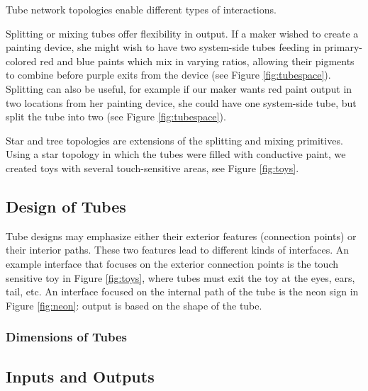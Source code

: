 Tube network topologies enable different types of interactions.

Splitting or mixing tubes offer flexibility in output.  If a maker wished to create a painting device, she might wish to have two system-side tubes feeding in primary-colored red and blue paints which mix in varying ratios, allowing their pigments to combine before purple exits from the device (see Figure \ref{fig:tubespace}).  Splitting can also be useful, for example if our maker wants red paint output in two locations from her painting device, she could have one system-side tube, but split the tube into two (see Figure \ref{fig:tubespace}). 

Star and tree topologies are extensions of the splitting and mixing primitives.  Using a star topology in which the tubes were filled with conductive paint, we created toys with several touch-sensitive areas, see Figure \ref{fig:toys}. 

\subsection{Design of Tubes}

Tube designs may emphasize either their exterior features (connection points) or their interior paths.  These two features lead to different kinds of interfaces.  An example interface that focuses on the exterior connection points is the touch sensitive toy in Figure \ref{fig:toys}, where tubes must exit the toy at the eyes, ears, tail, etc.  An interface focused on the internal path of the tube is the neon sign in Figure \ref{fig:neon}: output is based on the shape of the tube.

\subsubsection{Dimensions of Tubes}


\subsection{Inputs and Outputs}

